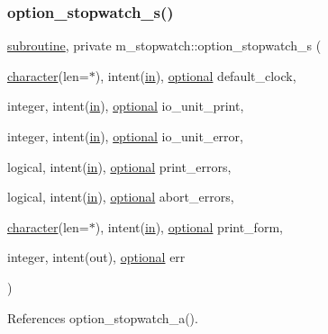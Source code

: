 \subsubsection{\texorpdfstring{option\+\_\+stopwatch\+\_\+s()}{option\_stopwatch\_s()}}
{\footnotesize\ttfamily \hyperlink{M__stopwatch_83_8txt_acfbcff50169d691ff02d4a123ed70482}{subroutine}, private m\+\_\+stopwatch\+::option\+\_\+stopwatch\+\_\+s (\begin{DoxyParamCaption}\item[{\hyperlink{option__stopwatch_83_8txt_abd4b21fbbd175834027b5224bfe97e66}{character}(len=$\ast$), intent(\hyperlink{M__journal_83_8txt_afce72651d1eed785a2132bee863b2f38}{in}), \hyperlink{option__stopwatch_83_8txt_aa4ece75e7acf58a4843f70fe18c3ade5}{optional}}]{default\+\_\+clock,  }\item[{integer, intent(\hyperlink{M__journal_83_8txt_afce72651d1eed785a2132bee863b2f38}{in}), \hyperlink{option__stopwatch_83_8txt_aa4ece75e7acf58a4843f70fe18c3ade5}{optional}}]{io\+\_\+unit\+\_\+print,  }\item[{integer, intent(\hyperlink{M__journal_83_8txt_afce72651d1eed785a2132bee863b2f38}{in}), \hyperlink{option__stopwatch_83_8txt_aa4ece75e7acf58a4843f70fe18c3ade5}{optional}}]{io\+\_\+unit\+\_\+error,  }\item[{logical, intent(\hyperlink{M__journal_83_8txt_afce72651d1eed785a2132bee863b2f38}{in}), \hyperlink{option__stopwatch_83_8txt_aa4ece75e7acf58a4843f70fe18c3ade5}{optional}}]{print\+\_\+errors,  }\item[{logical, intent(\hyperlink{M__journal_83_8txt_afce72651d1eed785a2132bee863b2f38}{in}), \hyperlink{option__stopwatch_83_8txt_aa4ece75e7acf58a4843f70fe18c3ade5}{optional}}]{abort\+\_\+errors,  }\item[{\hyperlink{option__stopwatch_83_8txt_abd4b21fbbd175834027b5224bfe97e66}{character}(len=$\ast$), intent(\hyperlink{M__journal_83_8txt_afce72651d1eed785a2132bee863b2f38}{in}), \hyperlink{option__stopwatch_83_8txt_aa4ece75e7acf58a4843f70fe18c3ade5}{optional}}]{print\+\_\+form,  }\item[{integer, intent(out), \hyperlink{option__stopwatch_83_8txt_aa4ece75e7acf58a4843f70fe18c3ade5}{optional}}]{err }\end{DoxyParamCaption})\hspace{0.3cm}{\ttfamily [private]}}



References option\+\_\+stopwatch\+\_\+a().

